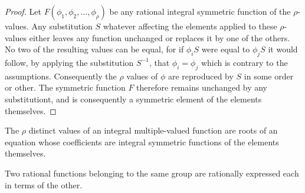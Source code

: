 \begin{proof}
Let $F(\phi_1, \phi_2, \hdots, \phi_\rho)$ be any rational integral symmetric function of the $\rho$-values. Any substitution $S$ whatever affecting the elements applied to these $\rho$-values
either leaves any function unchanged or replaces it by one of the others. No two of the resulting values can be equal, for if $\phi_i S$ were equal to $\phi_j S$ it would follow, by applying the substitution $S^{-1}$,  that $\phi_i = \phi_j$ which is contrary to the assumptions. Consequently the $\rho$ values of $\phi$ are reproduced by $S$ in some order or other. The symmetric function $F$ therefore remains unchanged by any substitutiont, and is consequently a symmetric element of the elements themselves. 
\end{proof}

\begin{corollary}
The $\rho$ distinct values of an integral multiple-valued function are roots of an equation whose coefficients are integral symmetric functions of the elements themselves.
\end{corollary}

\begin{theorem}
Two rational functions belonging to the same group are rationally expressed each in terms of the other.
\label{FunctionsOfSameGroup}\end{theorem}

